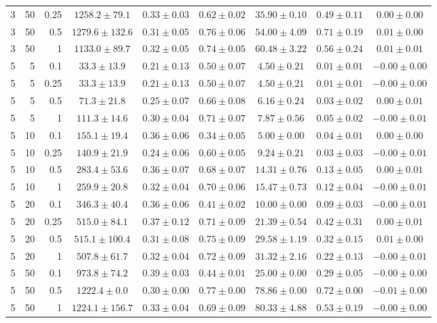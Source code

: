 \begin{table}[htbp]
\begin{tabular}{@{}rrrcccccc@{}}
3 & 50 & 0.25 & $1258.2 \pm 79.1$ & $0.33 \pm 0.03$ & $0.62 \pm 0.02$ & $35.90 \pm 0.10$ & $0.49 \pm 0.11$ & $0.00 \pm 0.00$ \\
3 & 50 & 0.5 & $1279.6 \pm 132.6$ & $0.31 \pm 0.05$ & $0.76 \pm 0.06$ & $54.00 \pm 4.09$ & $0.71 \pm 0.19$ & $0.01 \pm 0.00$ \\
3 & 50 & 1 & $1133.0 \pm 89.7$ & $0.32 \pm 0.05$ & $0.74 \pm 0.05$ & $60.48 \pm 3.22$ & $0.56 \pm 0.24$ & $0.01 \pm 0.01$ \\
\midrule
5 & 5 & 0.1 & $33.3 \pm 13.9$ & $0.21 \pm 0.13$ & $0.50 \pm 0.07$ & $4.50 \pm 0.21$ & $0.01 \pm 0.01$ & $-0.00 \pm 0.00$ \\
5 & 5 & 0.25 & $33.3 \pm 13.9$ & $0.21 \pm 0.13$ & $0.50 \pm 0.07$ & $4.50 \pm 0.21$ & $0.01 \pm 0.01$ & $-0.00 \pm 0.00$ \\
5 & 5 & 0.5 & $71.3 \pm 21.8$ & $0.25 \pm 0.07$ & $0.66 \pm 0.08$ & $6.16 \pm 0.24$ & $0.03 \pm 0.02$ & $0.00 \pm 0.01$ \\
5 & 5 & 1 & $111.3 \pm 14.6$ & $0.30 \pm 0.04$ & $0.71 \pm 0.07$ & $7.87 \pm 0.56$ & $0.05 \pm 0.02$ & $-0.00 \pm 0.01$ \\
5 & 10 & 0.1 & $155.1 \pm 19.4$ & $0.36 \pm 0.06$ & $0.34 \pm 0.05$ & $5.00 \pm 0.00$ & $0.04 \pm 0.01$ & $0.00 \pm 0.00$ \\
5 & 10 & 0.25 & $140.9 \pm 21.9$ & $0.24 \pm 0.06$ & $0.60 \pm 0.05$ & $9.24 \pm 0.21$ & $0.03 \pm 0.03$ & $-0.00 \pm 0.01$ \\
5 & 10 & 0.5 & $283.4 \pm 53.6$ & $0.36 \pm 0.07$ & $0.68 \pm 0.07$ & $14.31 \pm 0.76$ & $0.13 \pm 0.05$ & $0.00 \pm 0.01$ \\
5 & 10 & 1 & $259.9 \pm 20.8$ & $0.32 \pm 0.04$ & $0.70 \pm 0.06$ & $15.47 \pm 0.73$ & $0.12 \pm 0.04$ & $-0.00 \pm 0.01$ \\
5 & 20 & 0.1 & $346.3 \pm 40.4$ & $0.36 \pm 0.06$ & $0.41 \pm 0.02$ & $10.00 \pm 0.00$ & $0.09 \pm 0.03$ & $-0.00 \pm 0.01$ \\
5 & 20 & 0.25 & $515.0 \pm 84.1$ & $0.37 \pm 0.12$ & $0.71 \pm 0.09$ & $21.39 \pm 0.54$ & $0.42 \pm 0.31$ & $0.00 \pm 0.01$ \\
5 & 20 & 0.5 & $515.1 \pm 100.4$ & $0.31 \pm 0.08$ & $0.75 \pm 0.09$ & $29.58 \pm 1.19$ & $0.32 \pm 0.15$ & $0.01 \pm 0.00$ \\
5 & 20 & 1 & $507.8 \pm 61.7$ & $0.32 \pm 0.04$ & $0.72 \pm 0.09$ & $31.32 \pm 2.16$ & $0.22 \pm 0.13$ & $-0.00 \pm 0.01$ \\
5 & 50 & 0.1 & $973.8 \pm 74.2$ & $0.39 \pm 0.03$ & $0.44 \pm 0.01$ & $25.00 \pm 0.00$ & $0.29 \pm 0.05$ & $-0.00 \pm 0.00$ \\
5 & 50 & 0.5 & $1222.4 \pm 0.0$ & $0.30 \pm 0.00$ & $0.77 \pm 0.00$ & $78.86 \pm 0.00$ & $0.72 \pm 0.00$ & $-0.01 \pm 0.00$ \\
5 & 50 & 1 & $1224.1 \pm 156.7$ & $0.33 \pm 0.04$ & $0.69 \pm 0.09$ & $80.33 \pm 4.88$ & $0.53 \pm 0.19$ & $-0.00 \pm 0.00$ \\
\bottomrule
\end{tabular}
\end{table}
